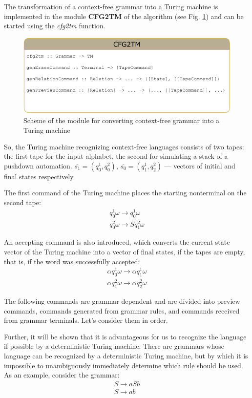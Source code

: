 \documentclass[conference]{IEEEtran}
\theoremstyle{definition}
\begin{document}
The transformation of a context-free grammar into a Turing machine is implemented in the module \textbf{CFG2TM} of the algorithm (see Fig. \ref{fig:cfg2tm}) and can be started using the \textit{cfg2tm} function.

\begin{figure}[H]
\centering
  \includegraphics[width=\linewidth]{pics/cfg2tm(1).pdf}
  \caption{Scheme of the module for converting context-free grammar into a Turing machine}
  \label{fig:cfg2tm}
\end{figure}

So, the Turing machine recognizing context-free languages consists of two tapes: the first
tape for the input alphabet, the second for simulating a stack of a pushdown automation.
$\overline{s_1} = (q_0^1, q_0^2)$, $\overline{s_0} = (q_1^1, q_2^2)$ --- vectors of initial and final states respectively.

The first command of the Turing machine places the starting nonterminal on the second tape:
$$\begin{array}{lcl}
    q_0^1 \omega \to q_0^1 \omega \\
    q_0^2 \omega \to S q_1^2 \omega 
\end{array}$$

An accepting command is also introduced, which converts the current state vector of the Turing machine into a vector of final states, if the tapes are empty, that is, if the word was successfully accepted:
$$\begin{array}{lcl}
    \alpha q_0^1 \omega \to \alpha q_1^1 \omega \\
    \alpha q_1^2 \omega \to \alpha q_2^2 \omega 
\end{array}$$

The following commands are grammar dependent and are divided into preview commands, commands generated from grammar rules, and commands received from grammar terminals. Let's consider them in order.

Further, it will be shown that it is advantageous for us to recognize the language if possible by a deterministic Turing machine. There are grammars whose language
can be recognized by a deterministic Turing machine, but by which it is impossible to unambiguously immediately determine which rule should be used. As an example, consider the grammar:
$$\begin{array}{lcl}
    S \to a S b \\
    S \to a b
\end{array}$$ 
\end{document}
